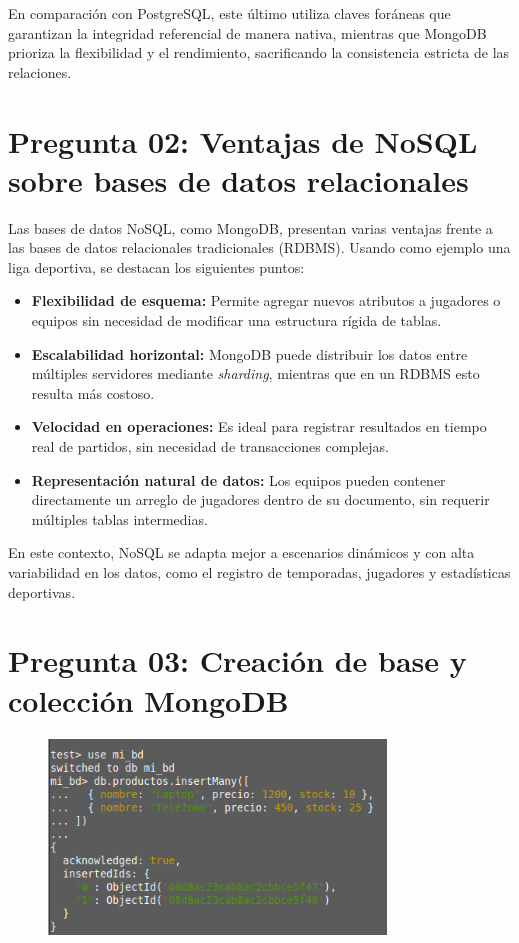 \documentclass[11pt]{article}
\begin{document}
En comparación con PostgreSQL, este último utiliza claves foráneas que garantizan la integridad referencial de manera nativa, mientras que MongoDB prioriza la flexibilidad y el rendimiento, sacrificando la consistencia estricta de las relaciones.

\vspace{0.3cm}

\section*{Pregunta 02: Ventajas de NoSQL sobre bases de datos relacionales}

Las bases de datos NoSQL, como MongoDB, presentan varias ventajas frente a las bases de datos relacionales tradicionales (RDBMS). Usando como ejemplo una liga deportiva, se destacan los siguientes puntos:

\begin{itemize}
    \item \textbf{Flexibilidad de esquema:} Permite agregar nuevos atributos a jugadores o equipos sin necesidad de modificar una estructura rígida de tablas.
    \item \textbf{Escalabilidad horizontal:} MongoDB puede distribuir los datos entre múltiples servidores mediante \textit{sharding}, mientras que en un RDBMS esto resulta más costoso.
    \item \textbf{Velocidad en operaciones:} Es ideal para registrar resultados en tiempo real de partidos, sin necesidad de transacciones complejas.
    \item \textbf{Representación natural de datos:} Los equipos pueden contener directamente un arreglo de jugadores dentro de su documento, sin requerir múltiples tablas intermedias.
\end{itemize}

En este contexto, NoSQL se adapta mejor a escenarios dinámicos y con alta variabilidad en los datos, como el registro de temporadas, jugadores y estadísticas deportivas.

\section*{Pregunta 03: Creación de base y colección MongoDB}

\begin{figure}[H]
    \centering
    \includegraphics[width=0.8\textwidth]{P03.png}
\end{figure}
\end{document}
